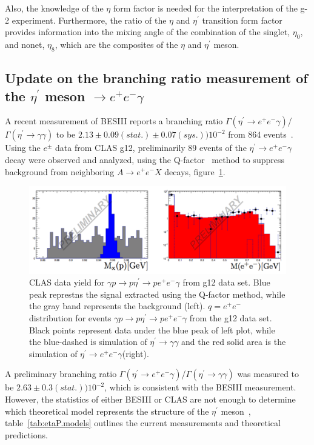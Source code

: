 \documentclass{aip-cp}
\begin{document}
Also, the knowledge of the $\eta$ form factor is needed for the interpretation of the g-2 experiment. Furthermore, the ratio of the $\eta$ and $\eta^{\prime}$ transition form factor provides information into the mixing angle of the combination of the singlet, $\eta_0$, and nonet, $\eta_8$, which are the composites of the $\eta$ and $\eta^{\prime}$ meson.
\subsection{Update on the branching ratio measurement  of the $\eta^\prime$ meson $\rightarrow e^+e^-\gamma$}
A recent measurement of BESIII reports a branching ratio $\Gamma(\eta^{\prime} \to  e^+ e^-  \gamma)$/$\Gamma(\eta^{\prime} \to  \gamma  \gamma)$ to be $2.13\pm0.09(stat.)\pm0.07(sys.))10^{-2}$ from 864 events~\cite{bib7}.  Using the $e^{\pm}$ data from CLAS g12, preliminarily 89 events of the $\eta^{\prime} \to  e^+ e^-  \gamma$ decay were observed and analyzed, using the Q-factor~\cite{bib8} method to suppress background from neighboring $A \to e^+ e^-  X$ decays, figure~\ref{fig:etaP_ff}.
 \begin{figure}[h!]
 	\centerline{\includegraphics[width=275 pt, height=125 pt]{figures/clas_etaP_ff.pdf}}
 	\caption{CLAS data yield for $\gamma p \to p \eta^{\prime}  \to p e^+ e^- \gamma $ from g12 data set. Blue peak represtns the signal extracted using the Q-factor method, while the gray band represents the background (left). $q=e^+ e^-$ distribution for events  $\gamma p \to p \eta^{\prime}  \to p e^+ e^- \gamma $ from the g12 data set. Black points represent data under the blue peak of left plot, while the blue-dashed is simulation of $\eta^{\prime} \to  \gamma  \gamma$ and the red solid area is the simulation of $\eta^{\prime} \to  e^+ e^-  \gamma$(right).}
 	\label{fig:etaP_ff}
 \end{figure}
  A preliminary branching ratio $\Gamma(\eta^{\prime} \to  e^+ e^-  \gamma)$/$\Gamma(\eta^{\prime} \to  \gamma  \gamma)$ was measured to be $2.63\pm0.3(stat.))10^{-2}$, which is consistent with the BESIII measurement. However, the statistics of either BESIII or CLAS are not enough to determine which theoretical model represents the structure of the $\eta^{\prime}$ meson~\cite{bib10,bib11,bib12}, table~\ref{tab:etaP.models} outlines the current measurements and theoretical predictions.

%
\end{document}
